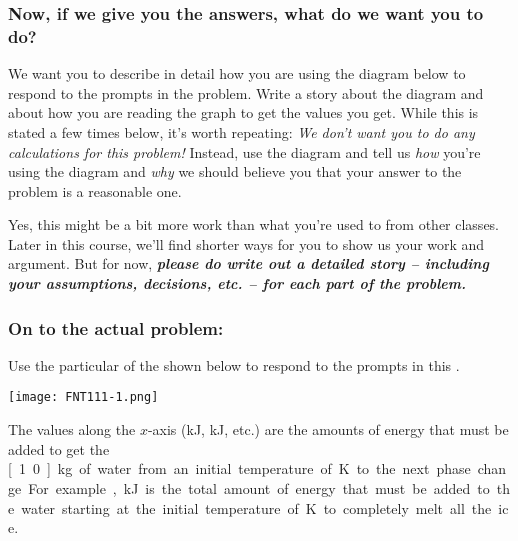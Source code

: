 \subsubsection*{Now, if we give you the answers, what do we want you to do?}

We want you to describe in detail how you are using the diagram below to respond to the prompts in the problem. Write a story about the diagram and about how you are reading the graph to get the values you get. While this is stated a few times below, it's worth repeating: \emph{We don't want you to do any calculations for this problem!} Instead, use the diagram and tell us \emph{how} you're using the diagram and \emph{why} we should believe you that your answer to the problem is a reasonable one.

Yes, this might be a bit more work than what you're used to from other classes. Later in this course, we'll find shorter ways for you to show us your work and argument. But for now, \textbf{\emph{please do write out a detailed story -- including your assumptions, decisions, etc. -- for each part of the problem.}}

\subsubsection*{On to the actual problem:}

Use the particular \TempGraph{} of the \ThreePhaseModel{} shown below to respond to the prompts in this \FNT{}.\\

\noindent
{\centering\texttt{[image: FNT111-1.png]}\par}

\noindent The values along the $x$-axis (\unit[146]{kJ}, \unit[480]{kJ}, etc.) are the amounts of energy that must be added to get the \unit[1.0]{kg} of water from an initial temperature of \unit[200]{K} to the next phase change. For example, \unit[480]{kJ} is the total amount of energy that must be added to the water starting at the initial temperature of \unit[200]{K} to completely melt all the ice.


